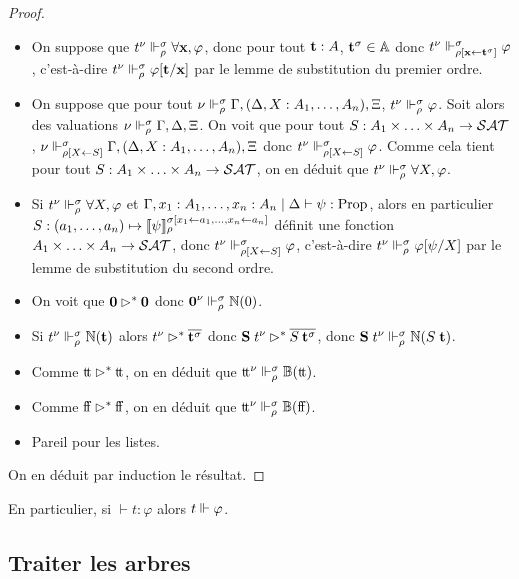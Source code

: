 \documentclass{article}
\begin{document}
\begin{proof}
\begin{itemize}
  \item On suppose que $t^\nu\Vdash_\rho^\sigma \forall \mathbf{x}, \varphi$, donc pour tout $\mathbf{t} : A$, $\mathbf{t}^\sigma \in \mathbb A$ donc $t^\nu\Vdash_{\rho[\mathbf{x}\leftarrow \mathbf{t}^\sigma]}^\sigma \varphi$, c'est-à-dire $t^\nu\Vdash_\rho^\sigma \varphi[\mathbf{t}/\mathbf{x}]$ par le lemme de substitution du premier ordre.
  \item On suppose que pour tout $\nu\Vdash_\rho^\sigma \Gamma, (\Delta, X : A_1,\ldots,A_n), \Xi$, $t^\nu \Vdash_\rho^\sigma \varphi$. Soit alors des valuations $\nu\Vdash_\rho^\sigma\Gamma, \Delta,\Xi$. On voit que pour tout $S : A_1\times\ldots\times A_n \to \mathcal {SAT}$, $\nu\Vdash_{\rho[X\leftarrow S]}^\sigma \Gamma, (\Delta, X : A_1,\ldots,A_n),\Xi$ donc $t^\nu\Vdash_{\rho[X\leftarrow S]}^\sigma \varphi$. Comme cela tient pour tout $S : A_1\times\ldots\times A_n \to \mathcal {SAT}$, on en déduit que $t^\nu\Vdash_\rho^\sigma \forall X, \varphi$.
  \item Si $t^\nu\Vdash_\rho^\sigma \forall X, \varphi$ et $\Gamma,x_1 : A_1,\ldots,x_n : A_n\mid\Delta\vdash \psi : \mathrm{Prop}$, alors en particulier $S : (a_1,\ldots,a_n) \mapsto \llbracket \psi \rrbracket_\rho^{\sigma[x_1\leftarrow a_1,\ldots, x_n \leftarrow a_n]}$ définit une fonction $A_1\times\ldots\times A_n \to\mathcal {SAT}$, donc $t^\nu\Vdash_{\rho[X\leftarrow S]}^\sigma \varphi$, c'est-à-dire $t^\nu\Vdash_\rho^\sigma \varphi[\psi/X]$ par le lemme de substitution du second ordre.
  \item On voit que $\boldsymbol 0\rhd^*\boldsymbol 0$ donc $\boldsymbol 0^\nu\Vdash_\rho^\sigma\mathbb{N}(0)$.
  \item Si $t^\nu\Vdash_\rho^\sigma \mathbb{N}(\mathbf{t})$ alors $t^\nu\rhd^*\overline{\mathbf{t}^\sigma}$ donc $\mathbf{S}\;t^\nu\rhd^* \overline{S\:\mathbf{t}^\sigma}$, donc $\mathbf{S}\;t^\nu\Vdash_\rho^\sigma \mathbb{N}(S\;\mathbf{t})$.
  \item Comme $\mathrm{t}\!\mathrm{t}\rhd^* \mathrm{t}\!\mathrm{t}$, on en déduit que $\mathrm{t}\!\mathrm{t}^\nu\Vdash_\rho^\sigma\mathbb{B}(\mathrm{t}\!\mathrm{t})$.
  \item Comme $\mathrm{f}\!\mathrm{f}\rhd^* \mathrm{f}\!\mathrm{f}$, on en déduit que $\mathrm{t}\!\mathrm{t}^\nu\Vdash_\rho^\sigma\mathbb{B}(\mathrm{f}\!\mathrm{f})$.
  \item Pareil pour les listes.
  \end{itemize}

  On en déduit par induction le résultat.
\end{proof}

En particulier, si $\vdash t : \varphi$ alors $t\Vdash \varphi$.

\subsection{Traiter les arbres}
\end{document}
